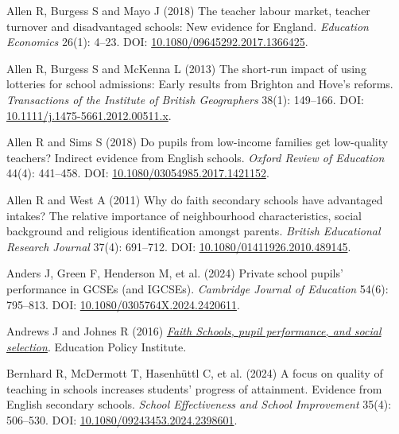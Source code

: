 \documentclass[
  11pt,
]{article}
\newlength{\cslhangindent}
\newenvironment{CSLReferences}[2] %
 {\begin{list}{}{%
  \setlength{\itemindent}{0pt}
  \setlength{\leftmargin}{0pt}
  \setlength{\parsep}{0pt}
  \ifodd #1
   \setlength{\leftmargin}{\cslhangindent}
   \setlength{\itemindent}{-1\cslhangindent}
  \fi
  \setlength{\itemsep}{#2\baselineskip}}}
 {\end{list}}
\begin{document}
\label{refs}
\begin{CSLReferences}{1}{1}
Allen R, Burgess S and Mayo J (2018) The teacher labour market, teacher
turnover and disadvantaged schools: New evidence for {England}.
\emph{Education Economics} 26(1): 4--23. DOI:
\href{https://doi.org/10.1080/09645292.2017.1366425}{10.1080/09645292.2017.1366425}.

Allen R, Burgess S and McKenna L (2013) The short-run impact of using
lotteries for school admissions: Early results from {Brighton} and
{Hove}'s reforms. \emph{Transactions of the Institute of British
Geographers} 38(1): 149--166. DOI:
\href{https://doi.org/10.1111/j.1475-5661.2012.00511.x}{10.1111/j.1475-5661.2012.00511.x}.

Allen R and Sims S (2018) Do pupils from low-income families get
low-quality teachers? {Indirect} evidence from {English} schools.
\emph{Oxford Review of Education} 44(4): 441--458. DOI:
\href{https://doi.org/10.1080/03054985.2017.1421152}{10.1080/03054985.2017.1421152}.

Allen R and West A (2011) Why do faith secondary schools have advantaged
intakes? {The} relative importance of neighbourhood characteristics,
social background and religious identification amongst parents.
\emph{British Educational Research Journal} 37(4): 691--712. DOI:
\href{https://doi.org/10.1080/01411926.2010.489145}{10.1080/01411926.2010.489145}.

Anders J, Green F, Henderson M, et al. (2024) Private school pupils'
performance in {GCSEs} (and {IGCSEs}). \emph{Cambridge Journal of
Education} 54(6): 795--813. DOI:
\href{https://doi.org/10.1080/0305764X.2024.2420611}{10.1080/0305764X.2024.2420611}.

Andrews J and Johnes R (2016)
\emph{\href{https://dera.ioe.ac.uk/id/eprint/27949/1/Pupil_characteristics_and_performance_at_faith_schools.pdf}{Faith
{Schools}, pupil performance, and social selection}}. Education Policy
Institute.

Bernhard R, McDermott T, Hasenhüttl C, et al. (2024) A focus on quality
of teaching in schools increases students' progress of attainment.
{Evidence} from {English} secondary schools. \emph{School Effectiveness
and School Improvement} 35(4): 506--530. DOI:
\href{https://doi.org/10.1080/09243453.2024.2398601}{10.1080/09243453.2024.2398601}.


\end{CSLReferences}
\end{document}
